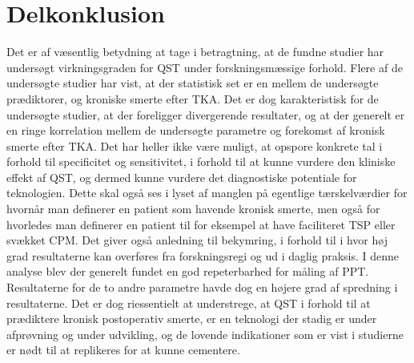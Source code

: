 \section{Delkonklusion}
Det er af væsentlig betydning at tage i betragtning, at de fundne studier har undersøgt virkningsgraden for QST under forskningsmæssige forhold. Flere af de undersøgte studier har vist, at der statistisk set er en mellem de undersøgte prædiktorer, og kroniske smerte efter TKA. Det er dog karakteristisk for de undersøgte studier, at der foreligger divergerende resultater, og at der generelt er en ringe korrelation mellem de undersøgte parametre og forekomst af kronisk smerte efter TKA.  Det har heller ikke være muligt, at opspore konkrete tal i forhold til specificitet og sensitivitet, i forhold til at kunne vurdere den kliniske effekt af QST, og dermed kunne vurdere det diagnostiske potentiale for teknologien. Dette skal også ses i lyset af manglen på egentlige tærskelværdier for hvornår man definerer en patient som havende kronisk smerte, men også for hvorledes man definerer en patient til for eksempel at have faciliteret TSP eller svækket CPM. Det giver også anledning til bekymring, i forhold til i hvor høj grad resultaterne kan overføres fra forskningsregi og ud i daglig praksis.
I denne analyse blev der generelt fundet en  god repeterbarhed for måling af PPT. Resultaterne for de to andre parametre havde dog en højere grad af spredning i resultaterne.
Det er dog riessentielt at understrege, at QST i forhold til at prædiktere kronisk postoperativ smerte, er en teknologi der stadig er under afprøvning og under udvikling, og de lovende indikationer som er vist i studierne er nødt til at replikeres  for at kunne cementere.



